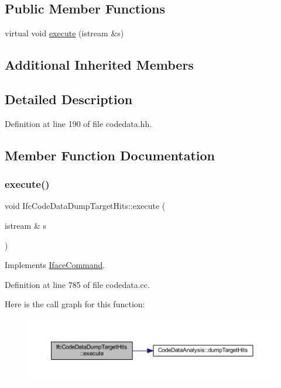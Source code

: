\subsection*{Public Member Functions}
\begin{DoxyCompactItemize}
\item 
virtual void \mbox{\hyperlink{class_ifc_code_data_dump_target_hits_a9b1c24dc6ceb8b6f66cc797fd3ce1f02}{execute}} (istream \&s)
\end{DoxyCompactItemize}
\subsection*{Additional Inherited Members}


\subsection{Detailed Description}


Definition at line 190 of file codedata.\+hh.



\subsection{Member Function Documentation}
\mbox{\label{class_ifc_code_data_dump_target_hits_a9b1c24dc6ceb8b6f66cc797fd3ce1f02}} 
\subsubsection{\texorpdfstring{execute()}{execute()}}
{\footnotesize\ttfamily void Ifc\+Code\+Data\+Dump\+Target\+Hits\+::execute (\begin{DoxyParamCaption}\item[{istream \&}]{s }\end{DoxyParamCaption})\hspace{0.3cm}{\ttfamily [virtual]}}



Implements \mbox{\hyperlink{class_iface_command_af10e29cee2c8e419de6efe9e680ad201}{Iface\+Command}}.



Definition at line 785 of file codedata.\+cc.

Here is the call graph for this function\+:
\nopagebreak
\begin{figure}[H]
\begin{center}
\leavevmode
\includegraphics[width=350pt]{class_ifc_code_data_dump_target_hits_a9b1c24dc6ceb8b6f66cc797fd3ce1f02_cgraph}
\end{center}
\end{figure}


